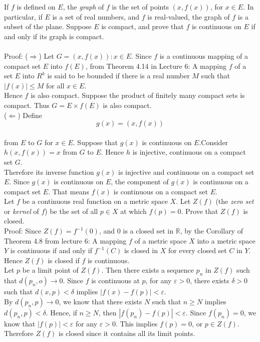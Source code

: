 \documentclass [12pt,letterpaper]{exam}
\begin{document}
\begin{questions}
\question If $f$ is defined on $E$, the {\em graph} of $f$ is the
set of points $(x,f(x))$, for $x \in E$. In particular, if $E$ is a
set of real numbers, and $f$ is real-valued, the graph of $f$ is a
subset of the plane. Suppose $E$ is compact, and prove that $f$ is
continuous on $E$ if and only if its graph is compact.
\\\\
Proof: ($\Rightarrow$) Let $G = {(x,f(x)):x \in E}$. Since $f$ is a continuous mapping of a compact set $E$ into $f(E)$, from Theorem 4.14 in Lecture 6: A mapping $f$ of a set $E$ into $R^k$ is said to be bounded if there is a real number $M$ such that $|f(x)| \leq M$ for all $x \in E$.\\
Hence $f$ is also compact. Suppose the product of finitely many compact sets is compact. Thus $G = E \times f(E)$ is also compact.\\
($\Leftarrow$) Define $$g(x) = (x,f(x))$$\\
from $E$ to $G$ for $x \in E$. Suppose that $g(x)$ is continuous on $E$.Consider $h(x,f(x)) = x$ from $G$ to $E$. Hence $h$ is injective, continuous on a compact set $G$. \\
Therefore its inverse function $g(x)$ is injective and continuous on a compact set $E$. Since $g(x)$ is continuous on $E$, the component of $g(x)$ is continuous on a compact set $E$. That means $f(x)$ is continuous on a compact set $E$.\\
 
\question Let $f$ be a continuous real function on a metric space
$X$. Let $Z(f)$ (the {\em zero set} or {\em kernel} of $f$) be the
set of all $p \in X$ at which $f(p)=0$. Prove that $Z(f)$ is closed.\\
Proof: Since $Z(f) = f^{-1}({0})$, and ${0}$ is a closed set in $\mathbb{R}$, by the Corollary of Theorem 4.8 from lecture 6: A mapping $f$ of a metric space $X$ into a metric space $Y$ is continuous if and only if $f^{-1}(C)$ is closed in $X$ for every closed set $C$ in $Y$.\\
Hence $Z(f)$ is closed if $f$ is continuous.\\
Let $p$ be a limit point of $Z(f)$. Then there exists a sequence ${p_n}$ in $Z(f)$ such that $d(p_n,o) \rightarrow 0$. Since $f$ is continuous at $p$, for any $\varepsilon > 0$, there exists $\delta > 0$ such that $d(x,p) < \delta$ implies $|f(x) - f(p)| < \varepsilon$.\\
By $d(p_n,p) \rightarrow 0$, we know that there exists $N$ such that $n \geq N$ implies $d(p_n,p) < \delta$. 
Hence, if $n \geq N$, then $|f(p_n) - f(p)| < \varepsilon$. Since $f(p_n) = 0$, we know that $|f(p)| < \varepsilon$ for any $\varepsilon > 0$. This implies $f(p) = 0$, or $p \in Z(f)$. Therefore $Z(f)$ is closed since it contains all its limit points.\\

\end{questions}
\end{document}
